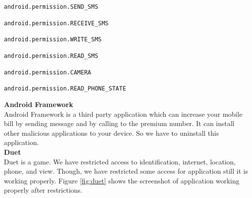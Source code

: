 \begin{itemize}
\begin{spacing}{0.9}
    \item \texttt{android.permission.SEND\_SMS}
\item \texttt{android.permission.RECEIVE\_SMS}
\item \texttt{android.permission.WRITE\_SMS}
\item \texttt{android.permission.READ\_SMS}
\item \texttt{android.permission.CAMERA}
\item \texttt{android.permission.READ\_PHONE\_STATE}
\end{spacing}
\end{itemize}
{\Large\textbf{Android Framework}}\\
Android Framework is a third party application which can increase your mobile bill by sending message and by calling to the premium number. It can install other malicious applications to your device. So we have to uninstall this application. \\
{\Large \textbf{Duet}}\\
Duet is a game. We have restricted access to identification, internet, location, phone, and view. Though, we have restricted some access for application still it is working properly. Figure \ref{fig:duet} shows the screenshot of application working properly after restrictions.

